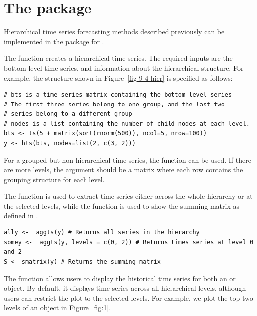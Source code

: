 \documentclass[nojss]{jss}
\newcommand{\R}{\proglang{R}}
\begin{document}
\section*{The  package}
   
Hierarchical time series forecasting methods described previously can be implemented in the  package \citep{HAH13} for {\R} \citep{Team13}.
   
The  function creates a hierarchical time series. The required inputs are the bottom-level time series, and information about the hierarchical structure. For example, the structure shown in Figure~\ref{fig-9-4-hier} is specified as follows:
\begin{Verbatim}
# bts is a time series matrix containing the bottom-level series
# The first three series belong to one group, and the last two 
# series belong to a different group
# nodes is a list containing the number of child nodes at each level.
bts <- ts(5 + matrix(sort(rnorm(500)), ncol=5, nrow=100))
y <- hts(bts, nodes=list(2, c(3, 2)))
\end{Verbatim}

For a grouped but non-hierarchical time series, the  function can be used. If there are more levels, the  argument should be a matrix where each row contains the grouping structure for each level.

The  function is used to extract time series either across the whole hierarchy or at the selected levels, while the  function is used to show the summing matrix as defined in \cite{HAA+11}.

\begin{Verbatim}
ally <-  aggts(y) # Returns all series in the hierarchy
somey <-  aggts(y, levels = c(0, 2)) # Returns times series at level 0 and 2
S <- smatrix(y) # Returns the summing matrix
\end{Verbatim}
   
The  function allows users to display the historical time series for both an  or  object. By default, it displays time series across all hierarchical levels, although users can restrict the plot to the selected levels. For example, we plot the top two levels of an  object in Figure~\ref{fig:1}.
   
\end{document}
